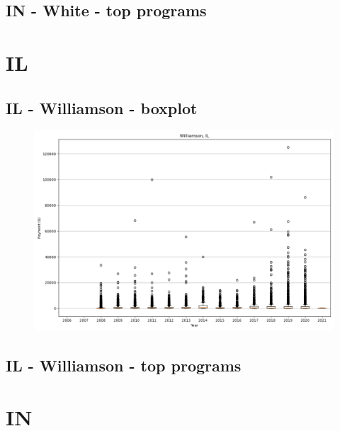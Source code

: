 \subsection*{IN - White - top programs}

\newpage
\section*{IL}
\subsection*{IL - Williamson - boxplot}
\begin{figure}[h]
\centering
\includegraphics[width=7in]{../output/boxplots/counties/Williamson-IL_boxplot.png}
\end{figure}


\subsection*{IL - Williamson - top programs}

\newpage
\section*{IN}
